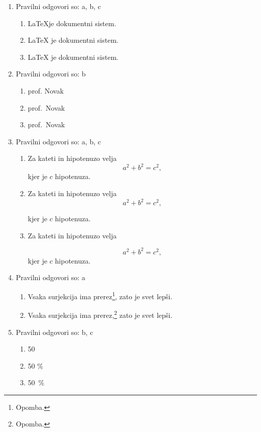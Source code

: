 \documentclass[11pt]{article}
\begin{document}
\begin{enumerate}
    \item Pravilni odgovori so: a, b, c %
    \begin{enumerate}
        \item \LaTeX je dokumentni sistem.
        \item {\LaTeX} je dokumentni sistem.
        \item \LaTeX{} je dokumentni sistem.
    \end{enumerate}

    \item Pravilni odgovori so: b %
    \begin{enumerate}
        \item prof. Novak
        \item prof.~Novak
        \item prof.\ Novak
    \end{enumerate}

    \item Pravilni odgovori so: a, b, c %
    \begin{enumerate}
        \item
Za kateti in hipotenuzo velja
\[
  a^2 + b^2 = c^2,
\]
kjer je \(c\) hipotenuza.
        \item
Za kateti in hipotenuzo velja
\[
  a^2 + b^2 = c^2,
\]

kjer je \(c\) hipotenuza.
        \item
Za kateti in hipotenuzo velja

\[
  a^2 + b^2 = c^2,
\]
kjer je \(c\) hipotenuza.
    \end{enumerate}

    \item Pravilni odgovori so: a %
    \begin{enumerate}
        \item Vsaka surjekcija ima prerez\footnote{Opomba.}, zato je svet lepši.
        \item Vsaka surjekcija ima prerez,\footnote{Opomba.} zato je svet lepši.
    \end{enumerate}

    \item Pravilni odgovori so: b, c %
    \begin{enumerate}
        \item 50 %
        \item 50 \%
        \item 50~\%
    \end{enumerate}


\end{enumerate}
\end{document}
